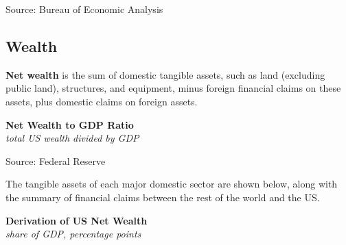 \documentclass{report}
\makeatletter
\newcommand{\tbllink}[1]{\href{https://raw.githubusercontent.com/bdecon/US-chartbook/master/chartbook/data/#1}{\faTable}}
\newcommand*\short[1]{\expandafter\@gobbletwo\number\numexpr#1\relax}
\newcommand{\sbar}[4]{
		\addplot[ybar stacked, bar width=2.4pt, draw opacity=0, fill=#1] 
			table [x=#2, y=#3, col sep=comma]{#4};}
\newcommand{\absnode}[3]{\node[below right, align=left] at (axis cs: #1,#2) {#3};}
\newcommand{\dateaxisticks}{
		date coordinates in=x, axis line style={draw=none},
		xmax={2023-02-15},
		max space between ticks=40,	    
		xtick={{1990-01-01}, {1992-01-01}, {1994-01-01}, 
			{1996-01-01}, {1998-01-01}, {2000-01-01}, 
			{2002-01-01}, {2004-01-01}, {2006-01-01},
			{2008-01-01}, {2010-01-01}, {2012-01-01}, {2014-01-01},
		    {2016-01-01}, {2018-01-01}, {2020-01-01}, {2022-01-01}, 
		    {2024-01-01}, {2026-01-01}},
		minor xtick={{1989-01-01}, {1991-01-01}, {1993-01-01},
			{1995-01-01}, {1997-01-01}, {1999-01-01}, 
			{2001-01-01}, {2003-01-01}, {2005-01-01}, {2007-01-01},
		    {2009-01-01}, {2011-01-01}, {2013-01-01}, {2015-01-01},
		    {2017-01-01}, {2019-01-01}, {2021-01-01}, {2023-01-01}, 
		    {2025-01-01}, {2027-01-01}},
		enlarge y limits={0.06}, enlarge x limits={0.01},
		}
\newcommand{\bbar}[2]{extra #1 ticks = {{#2}}, extra #1 tick labels = ,
		extra #1 tick style = {grid=major, grid style={thick, black!25}},}
\newcommand{\rbars}{
		\fill[color=black!10] (axis cs:{1990-07-01},\pgfkeysvalueof{/pgfplots/ymin}) rectangle 
			(axis cs:{1991-03-01}, \pgfkeysvalueof{/pgfplots/ymax});
		\fill[color=black!10] (axis cs:{2007-12-01},\pgfkeysvalueof{/pgfplots/ymin}) rectangle 
			(axis cs:{2009-07-01}, \pgfkeysvalueof{/pgfplots/ymax});
		\fill[color=black!10] (axis cs:{2001-03-01},\pgfkeysvalueof{/pgfplots/ymin}) rectangle 
			(axis cs:{2001-11-01}, \pgfkeysvalueof{/pgfplots/ymax});
		\fill[color=black!10] (axis cs:{2020-02-01},\pgfkeysvalueof{/pgfplots/ymin}) rectangle 
			(axis cs:{2020-05-01}, \pgfkeysvalueof{/pgfplots/ymax});}
\makeatother
\begin{document}
{\begin{minipage}{0.76\textwidth}
\footnotesize{Source: Bureau of Economic Analysis} \hfill \tbllink{sectbal2.csv}
\end{minipage}
\newpage
\begin{minipage}{0.76\textwidth}
\subsection*{Wealth}
\hypertarget{ofw}{}
\small \textbf{Net wealth} is the sum of domestic tangible assets, such as land (excluding public land), structures, and equipment, minus foreign financial claims on these assets, plus domestic claims on foreign assets.   


\vspace{1mm}

\normalsize \textbf{Net Wealth to GDP Ratio}\\
\footnotesize{\textit{total US wealth divided by GDP}}
\vspace{3.4cm}

\hspace{2mm} 

\footnotesize{Source: Federal Reserve} \hfill \tbllink{wealthgdp.csv}
\vspace{2mm}

\small The tangible assets of each major domestic sector are shown below, along with the summary of financial claims between the rest of the world and the US.
\vspace{1mm}

\normalsize \textbf{Derivation of US Net Wealth}\\
\footnotesize{\textit{share of GDP, percentage points}}\\ 
 \setlength{\tabcolsep}{3.5pt} \color{black!90}
		{\renewcommand{\arraystretch}{1.65}
		 \begin{tabular}{p{40mm} R{7.8mm} R{7.8mm} R{7.8mm} R{7.8mm} 
		   R{8.2mm} R{8.2mm} R{8.2mm} }
			  \hline
		\end{tabular}}	\vspace{-2mm}
		

\end{minipage}}
\end{document}
